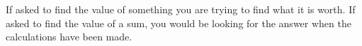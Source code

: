If asked to find the value of something you are trying to find what 
it is worth.  If asked to find the value of a sum, you would be 
looking for the answer when the calculations have been made.